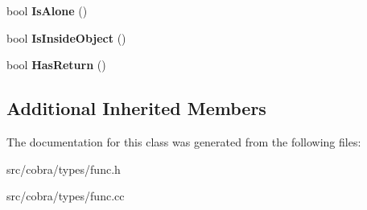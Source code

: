 \begin{DoxyCompactItemize}
\item 
\hypertarget{class_cobra_1_1internal_1_1_func_aa46786332593fee25536a03f69a40701}{bool {\bfseries Is\+Alone} ()}\label{class_cobra_1_1internal_1_1_func_aa46786332593fee25536a03f69a40701}

\item 
\hypertarget{class_cobra_1_1internal_1_1_func_a43a2d8621fd751a6745b4a334a3199cc}{bool {\bfseries Is\+Inside\+Object} ()}\label{class_cobra_1_1internal_1_1_func_a43a2d8621fd751a6745b4a334a3199cc}

\item 
\hypertarget{class_cobra_1_1internal_1_1_func_a577755ec51bb7480a384084032080d31}{bool {\bfseries Has\+Return} ()}\label{class_cobra_1_1internal_1_1_func_a577755ec51bb7480a384084032080d31}

\end{DoxyCompactItemize}
\subsection*{Additional Inherited Members}


The documentation for this class was generated from the following files\+:\begin{DoxyCompactItemize}
\item 
src/cobra/types/func.\+h\item 
src/cobra/types/func.\+cc\end{DoxyCompactItemize}
